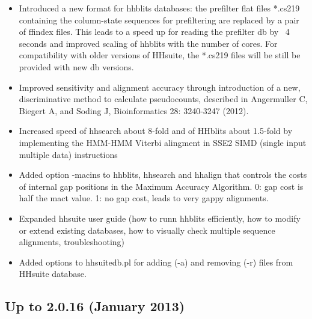 \documentclass[11pt,a4paper]{article}
\begin{document}
\begin{itemize}
\item Introduced a new format for hhblits databases: the prefilter flat files 
  *.cs219 containing the column-state sequences for prefiltering are replaced
  by a pair of ffindex files. This leads to a speed up for reading the prefilter 
  db by ~4 seconds and improved scaling of hhblits with the number of cores. 
  For compatibility with older versions of HHsuite, the *.cs219 files will 
  be still be provided with new db versions.

\item Improved sensitivity and alignment accuracy through introduction of a new,
  discriminative method to calculate pseudocounts, described in Angermuller C, 
  Biegert A, and Soding J, Bioinformatics 28: 3240-3247 (2012).

\item Increased speed of hhsearch about 8-fold and of HHblits about 1.5-fold by 
  implementing the HMM-HMM Viterbi alingment in SSE2 SIMD (single input 
  multiple data) instructions 

\item Added option -macins to hhblits, hhsearch and hhalign that controls the
  costs of internal gap positions in the Maximum Accuracy Algorithm. 
  0: gap cost is half the mact value. 1: no gap cost, leads to very gappy 
  alignments.

\item Expanded hhsuite user guide (how to runn hhblits efficiently, how to 
  modify or extend existing databases, how to visually check multiple sequence 
  alignments, troubleshooting)

\item Added options to hhsuitedb.pl for adding (-a) and removing (-r) files 
  from HHsuite database.

\end{itemize}

\subsection{Up to 2.0.16 (January 2013)}
\end{document}
